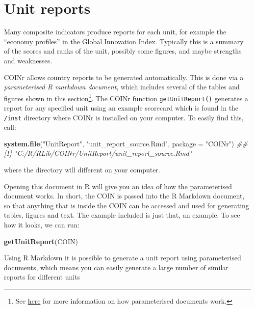 \documentclass[
]{book}
\newenvironment{Shaded}{\begin{snugshade}}{\end{snugshade}}
\newcommand{\CommentTok}[1]{\textcolor[rgb]{0.56,0.35,0.01}{\textit{#1}}}
\newcommand{\DataTypeTok}[1]{\textcolor[rgb]{0.13,0.29,0.53}{#1}}
\newcommand{\KeywordTok}[1]{\textcolor[rgb]{0.13,0.29,0.53}{\textbf{#1}}}
\newcommand{\NormalTok}[1]{#1}
\newcommand{\StringTok}[1]{\textcolor[rgb]{0.31,0.60,0.02}{#1}}
\begin{document}
\hypertarget{unit-reports}{%
\section{Unit reports}\label{unit-reports}}

Many composite indicators produce reports for each unit, for example the ``economy profiles'' in the Global Innovation Index. Typically this is a summary of the scores and ranks of the unit, possibly some figures, and maybe strengths and weaknesses.

COINr allows country reports to be generated automatically. This is done via a \emph{parameterised R markdown document}, which includes several of the tables and figures shown in this section\footnote{See \href{https://bookdown.org/yihui/rmarkdown/parameterized-reports.html}{here} for more information on how parameterised documents work.}. The COINr function \texttt{getUnitReport()} generates a report for any specified unit using an example scorecard which is found in the \texttt{/inst} directory where COINr is installed on your computer. To easily find this, call:

\begin{Shaded}
\begin{Highlighting}[]
\KeywordTok{system.file}\NormalTok{(}\StringTok{"UnitReport"}\NormalTok{, }\StringTok{"unit_report_source.Rmd"}\NormalTok{, }\DataTypeTok{package =} \StringTok{"COINr"}\NormalTok{)}
\CommentTok{## [1] "C:/R/RLib/COINr/UnitReport/unit_report_source.Rmd"}
\end{Highlighting}
\end{Shaded}

where the directory will different on your computer.

Opening this document in R will give you an idea of how the parameterised document works. In short, the COIN is passed into the R Markdown document, so that anything that is inside the COIN can be accessed and used for generating tables, figures and text. The example included is just that, an example. To see how it looks, we can run:

\begin{Shaded}
\begin{Highlighting}[]
\KeywordTok{getUnitReport}\NormalTok{(COIN)}
\end{Highlighting}
\end{Shaded}

Using R Markdown it is possible to generate a unit report using parameterised documents, which means you can easily generate a large number of similar reports for different units
\end{document}
